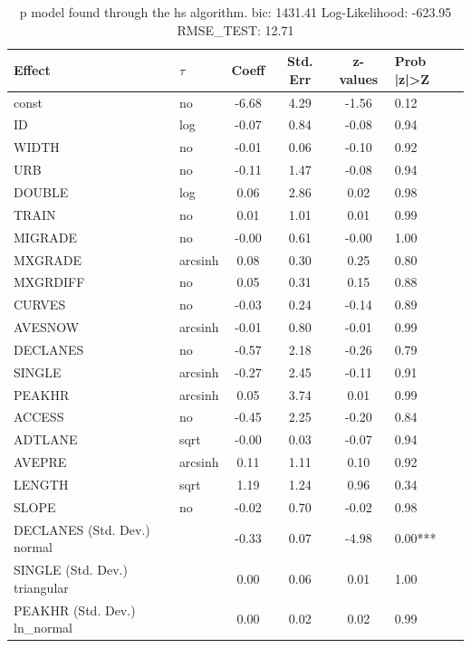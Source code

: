 \begin{table}
	\caption{p model found through the hs algorithm. bic: 1431.41 Log-Likelihood: -623.95 RMSE_TEST: 12.71}
	\begin{center}
		\begin{tabular}{|l|l|c|c|c|l|}
			\hline
			Effect & $\tau$ & Coeff & Std. Err & z-values & Prob |z|>Z \\
			\hline
			const & no & -6.68 & 4.29 & -1.56 & 0.12 \\
			\hline
			ID & log & -0.07 & 0.84 & -0.08 & 0.94 \\
			\hline
			WIDTH & no & -0.01 & 0.06 & -0.10 & 0.92 \\
			\hline
			URB & no & -0.11 & 1.47 & -0.08 & 0.94 \\
			\hline
			DOUBLE & log & 0.06 & 2.86 & 0.02 & 0.98 \\
			\hline
			TRAIN & no & 0.01 & 1.01 & 0.01 & 0.99 \\
			\hline
			MIGRADE & no & -0.00 & 0.61 & -0.00 & 1.00 \\
			\hline
			MXGRADE & arcsinh & 0.08 & 0.30 & 0.25 & 0.80 \\
			\hline
			MXGRDIFF & no & 0.05 & 0.31 & 0.15 & 0.88 \\
			\hline
			CURVES & no & -0.03 & 0.24 & -0.14 & 0.89 \\
			\hline
			AVESNOW & arcsinh & -0.01 & 0.80 & -0.01 & 0.99 \\
			\hline
			DECLANES & no & -0.57 & 2.18 & -0.26 & 0.79 \\
			\hline
			SINGLE & arcsinh & -0.27 & 2.45 & -0.11 & 0.91 \\
			\hline
			PEAKHR & arcsinh & 0.05 & 3.74 & 0.01 & 0.99 \\
			\hline
			ACCESS & no & -0.45 & 2.25 & -0.20 & 0.84 \\
			\hline
			ADTLANE & sqrt & -0.00 & 0.03 & -0.07 & 0.94 \\
			\hline
			AVEPRE & arcsinh & 0.11 & 1.11 & 0.10 & 0.92 \\
			\hline
			LENGTH & sqrt & 1.19 & 1.24 & 0.96 & 0.34 \\
			\hline
			SLOPE & no & -0.02 & 0.70 & -0.02 & 0.98 \\
			\hline
			DECLANES (Std. Dev.) normal &  & -0.33 & 0.07 & -4.98 & 0.00*** \\
			\hline
			SINGLE (Std. Dev.) triangular &  & 0.00 & 0.06 & 0.01 & 1.00 \\
			\hline
			PEAKHR (Std. Dev.) ln_normal &  & 0.00 & 0.02 & 0.02 & 0.99 \\

\end{tabular}
\end{center}
\end{table}

